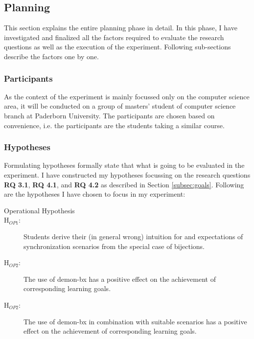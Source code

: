 \subsection{Planning}\label{subsec:planning}
This section explains the entire planning phase in detail. In this phase, I have investigated and  finalized all the factors required to evaluate the research questions as well as the execution of the experiment. Following sub-sections describe the factors one by one.

\subsubsection{Participants}\label{subsubsec:participants}
As the context of the experiment is mainly focussed only on the computer science area, it will be conducted on a group of masters' student of computer science branch at Paderborn University. The participants are chosen based on convenience, i.e. the participants are the students taking a similar course.

\subsubsection{Hypotheses}\label{subsubsec:hypotheses}
Formulating hypotheses formally state that what is going to be evaluated in the experiment. I have constructed my hypotheses focussing on the research questions \textbf{RQ 3.1}, \textbf{RQ 4.1}, and  \textbf{RQ 4.2} as described in Section \ref{subsec:goals}. Following are the hypotheses I have chosen to focus in my experiment:\\

\begin{description}
	\item[Operational Hypothesis]
	\item[H$_{OP1}$:] Students derive their (in general wrong) intuition for and expectations of synchronization scenarios from the special case of bijections.
	\item[H$_{OP2}$:] The use of demon-bx has a positive effect on the achievement of corresponding learning goals.\\
	\item[H$_{OP2}$:] The use of demon-bx in combination with suitable scenarios has a positive effect on the achievement of corresponding learning goals.\\
\end{description}

